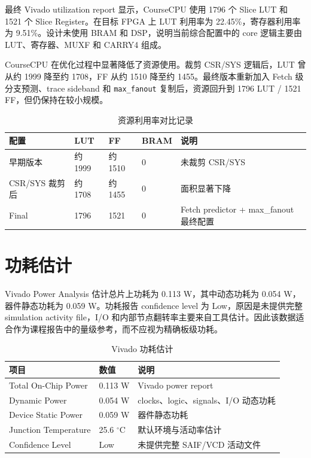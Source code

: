 \documentclass[UTF8,a4paper,12pt]{ctexrep}
\begin{document}
最终 Vivado utilization report 显示，CourseCPU 使用 1796 个 Slice LUT 和 1521 个 Slice Register。在目标 FPGA 上 LUT 利用率为 22.45\%，寄存器利用率为 9.51\%。设计未使用 BRAM 和 DSP，说明当前综合配置中的 core 逻辑主要由 LUT、寄存器、MUXF 和 CARRY4 组成。

CourseCPU 在优化过程中显著降低了资源使用。裁剪 CSR/SYS 逻辑后，LUT 曾从约 1999 降至约 1708，FF 从约 1510 降至约 1455。最终版本重新加入 Fetch 级分支预测、trace sideband 和 \texttt{max\_fanout} 复制后，资源回升到 1796 LUT / 1521 FF，但仍保持在较小规模。

\begin{table}[htbp]
  \centering
  \caption{资源利用率对比记录}
  \begin{tabularx}{\textwidth}{lXXXX}
    \toprule
    配置 & LUT & FF & BRAM & 说明 \\
    \midrule
    早期版本 & 约 1999 & 约 1510 & 0 & 未裁剪 CSR/SYS \\
    CSR/SYS 裁剪后 & 约 1708 & 约 1455 & 0 & 面积显著下降 \\
    Final & 1796 & 1521 & 0 & Fetch predictor + max\_fanout 最终配置 \\
    \bottomrule
  \end{tabularx}
\end{table}

\section{功耗估计}

Vivado Power Analysis 估计总片上功耗为 0.113 W，其中动态功耗为 0.054 W，器件静态功耗为 0.059 W。功耗报告 confidence level 为 Low，原因是未提供完整 simulation activity file，I/O 和内部节点翻转率主要来自工具估计。因此该数据适合作为课程报告中的量级参考，而不应视为精确板级功耗。

\begin{table}[htbp]
  \centering
  \caption{Vivado 功耗估计}
  \begin{tabularx}{\textwidth}{lXX}
    \toprule
    项目 & 数值 & 说明 \\
    \midrule
    Total On-Chip Power & 0.113 W & Vivado power report \\
    Dynamic Power & 0.054 W & clocks、logic、signals、I/O 动态功耗 \\
    Device Static Power & 0.059 W & 器件静态功耗 \\
    Junction Temperature & 25.6 $^\circ$C & 默认环境与活动率估计 \\
    Confidence Level & Low & 未提供完整 SAIF/VCD 活动文件 \\
    \bottomrule
  \end{tabularx}
\end{table}
\end{document}

